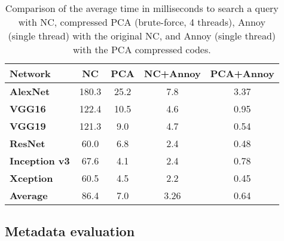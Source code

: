 \documentclass[final, twocolumn]{elsarticle}
\begin{document}
\begin{table*}
\centering
\footnotesize

\begin{tabular}{lcccc}
\hline
\textbf{Network}      & \textbf{NC} & \textbf{PCA} & \textbf{NC+Annoy} & \textbf{PCA+Annoy} \\ \hline
\textbf{AlexNet}      & 180.3  & 25.2  & 7.8 & 3.37  \\ %
\textbf{VGG16}        & 122.4  & 10.5   & 4.6 & 0.95          \\
\textbf{VGG19}        & 121.3  & 9.0    & 4.7 & 0.54          \\
\textbf{ResNet}       & 60.0  & 6.8     & 2.4 & 0.48            \\
\textbf{Inception v3} & 67.6   & 4.1    & 2.4 & 0.78         \\
\textbf{Xception}     & 60.5    & 4.5 &  2.2  & 0.45         \\ \hline
\textbf{Average}      & 86.4   & 7.0   &  3.26  & 0.64    \\ \hline
\end{tabular}

\caption{Comparison of the average time in milliseconds to search a query with NC, compressed PCA (brute-force, 4 threads), Annoy (single thread) with the original NC, and Annoy (single thread) with the PCA compressed codes.}
\label{tab:pca_times}
\end{table*}





\subsection{Metadata evaluation}
\label{sec:metadata}
\end{document}
